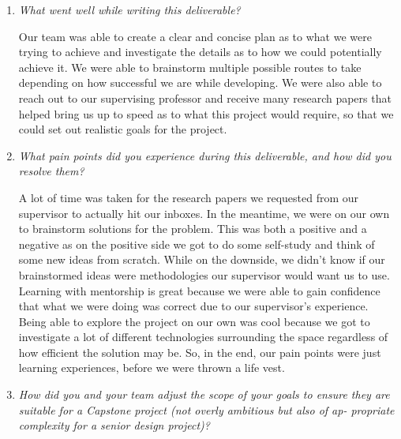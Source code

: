 \documentclass{article}
\begin{document}
\begin{enumerate}
  \item \textit{What went well while writing this deliverable?}

    Our team was able to create a clear and concise plan as to what
    we were trying to achieve and investigate the details as to how
    we could potentially achieve it. We were able to brainstorm
    multiple possible routes to take depending on how successful we
    are while developing. We were also able to reach out to our
    supervising professor and receive many research papers that
    helped bring us up to speed as to what this project would
    require, so that we could set out realistic goals for the project.
  \item \textit{What pain points did you experience during this
    deliverable, and how did you resolve them?}

    A lot of time was taken for the research papers we requested from
    our supervisor to actually hit our inboxes. In the meantime, we
    were on our own to brainstorm solutions for the problem. This was
    both a positive and a negative as on the positive side we got to
    do some self-study and think of some new ideas from scratch.
    While on the downside, we didn’t know if our brainstormed ideas
    were methodologies our supervisor would want us to use. Learning
    with mentorship is great because we were able to gain confidence
    that what we were doing was correct due to our supervisor’s
    experience. Being able to explore the project on our own was cool
    because we got to investigate a lot of different technologies
    surrounding the space regardless of how efficient the solution
    may be. So, in the end, our pain points were just learning
    experiences, before we were thrown a life vest.


  \item \textit{How did you and your team adjust the scope of your
      goals to ensure they
      are suitable for a Capstone project (not overly ambitious but also of ap-
    propriate complexity for a senior design project)?}


\end{enumerate}
\end{document}
